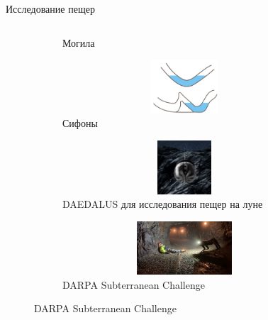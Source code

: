 \begin{frame}[t]{Исследование пещер}
\begin{columns}[T,onlytextwidth]
\begin{column}{0.37\textwidth}
\begin{figure}[H]
\begin{subfigure}{0.49\textwidth}
                    \caption*{Могила}
                \end{subfigure}
                \begin{subfigure}{0.49\textwidth}
                    \centering\includegraphics[height=2cm,width=1\textwidth,keepaspectratio]{../images/surface_types/siphon.png}
                    \caption*{Сифоны}
                \end{subfigure}
            
                \begin{subfigure}{0.49\textwidth}
                    \centering\includegraphics[height=2cm,width=1\textwidth,keepaspectratio]{../images/slides/daedalus.jpg}
                    \caption*{DAEDALUS для исследования пещер на луне}
                \end{subfigure}
                \begin{subfigure}{0.49\textwidth}
                    \centering\includegraphics[height=2cm,width=1\textwidth,keepaspectratio]{../images/open_cave.jpg}
                    \caption*{DARPA Subterranean Challenge}
                \end{subfigure}
            \end{figure}
        \end{column}
    \end{columns}
\end{frame}

